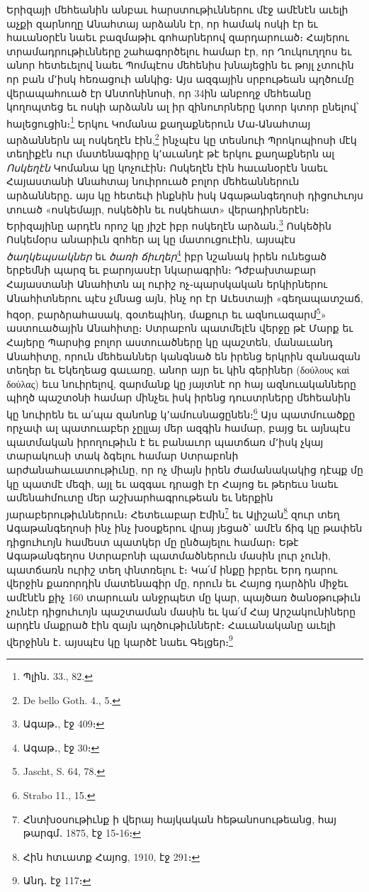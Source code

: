 \documentclass{article}
\begin{document}
{Երիզայի մեհեանին անբաւ հարստութիւններու մէջ ամէնէն աւելի աչքի զարնողը Անահտայ արձանն էր, որ համակ ոսկի էր եւ հաւանօրէն նաեւ բազմաթիւ գոհարներով զարդարուած։ Հայերու տրամադրութիւնները շահագործելու համար էր, որ Ղուկուղղոս եւ անոր հետեւելով նաեւ Պոմպէոս մեհենիս խնայեցին եւ թոյլ չտուին որ բան մ՚իսկ հեռացուի անկից։ Այս ազգային սրբութեան պղծումը վերապահուած էր Անտոնինոսի, որ 34ին անբողջ մեհեանը կողոպտեց եւ ոսկի արձանն ալ իր զինուորները կտոր կտոր ընելով՝ հալեցուցին։\footnote{Պլին․ 33., 82.} Երկու Կոմանա քաղաքներուն Մա֊Անահտայ արձաններն ալ ոսկեղէն էին,\footnote{De bello Goth. 4., 5.} ինչպէս կը տեսնուի Պրոկոպիոսի մէկ տեղիքէն ուր մատենագիրը կ՚աւանդէ թէ երկու քաղաքներն ալ \emph{Ոսկեղէն} Կոմանա կը կոչուէին։ Ոսկեղէն էին հաւանօրէն նաեւ Հայաստանի Անահտայ նուիրուած բոլոր մեհեաններուն արձանները․ այս կը հետեւի ինքնին իսկ Ագաթանգեղոսի դիցուհւոյս տուած «ոսկեմայր, ոսկեծին եւ ոսկեհատ» վերադիրներէն։ Երիզայինը արդէն որոշ կը յիշէ իբր ոսկեղէն արձան․\footnote{Ագաթ․, էջ 409։} Ոսկեծին Ոսկեմօրս անարիւն զոհեր ալ կը մատուցուէին, այսպէս \emph{ծաղկեպսակներ} եւ \emph{ծառի ճիւղեր}\footnote{Ագաթ․, էջ 30։} իբր նշանակ իրեն ունեցած երբեմնի պարզ եւ բարոյասէր նկարագրին։ Դժբախտաբար Հայաստանի Անահիտն ալ ուրիշ ոչ֊պարսկական երկիրներու Անահիտներու պէս չմնաց այն, ինչ որ էր Աւեստայի «գեղապատշաճ, հզօր, բարձրահասակ, գօտեպինդ, մաքուր եւ ազնուազարմ\footnote{Jascht, S. 64, 78.}» աստուածային Անահիտը։ Ստրաբոն պատմելէն վերջը թէ Մարք եւ Հայերը Պարսից բոլոր աստուածները կը պաշտեն, մանաւանդ Անահիտը, որուն մեհեաններ կանգնած են իրենց երկրին զանազան տեղեր եւ Եկեղեաց գաւառը, անոր այր եւ կին գերիներ (δούλους καὶ δούλας) եւս նուիրելով, զարմանք կը յայտնէ որ հայ ազնուականները պիղծ պաշտօնի համար մինչեւ իսկ իրենց դուստրները մեհեանին կը նուիրեն եւ ա՛պա զանոնք կ՚ամուսնացընեն։\footnote{Strabo 11., 15.} Այս պատմուածքը որչափ ալ պատուաբեր չըլլայ մեր ազգին համար, բայց եւ այնպէս պատմական իրողութիւն է եւ բանաւոր պատճառ մ՚իսկ չկայ տարակուսի տակ ձգելու համար Ստրաբոնի արժանահաւատութիւնը, որ ոչ միայն իրեն ժամանակակից դէպք մը կը պատմէ մեզի, այլ եւ ազգաւ դրացի էր Հայոց եւ թերեւս նաեւ ամենահմուտը մեր աշխարհագրութեան եւ ներքին յարաբերութիւններուն։ Հետեւաբար Էմին\footnote{Հնտխօսութիւնք ի վերայ հայկական հեթանոսութեանց, հայ թարգմ․ 1875, էջ 15֊16։} եւ Ալիշան\footnote{Հին հտւատք Հայոց, 1910, էջ 291։} զուր տեղ Ագաթանգեղոսի ինչ ինչ խօսքերու վրայ յեցած՝ ամէն ճիգ կը թափեն դիցուհւոյն համեստ պատկեր մը ընծայելու համար։ Եթէ Ագաթանգեղոս Ստրաբոնի պատմածներուն մասին լուր չունի, պատճառն ուրիշ տեղ փնտռելու է։ Կա՛մ ինքը իբրեւ Երդ դարու վերջին քառորդին մատենագիր մը, որուն եւ Հայոց դարձին միջեւ ամէնէն քիչ 160 տարուան անջրպետ մը կար, պայծառ ծանօթութիւն չունէր դիցուհւոյն պաշտաման մասին եւ կա՛մ Հայ Արշակունիները արդէն մաքրած էին զայն պղծութիւններէ։ Հաւանականը աւելի վերջինն է․ այսպէս կը կարծէ նաեւ Գելցեր։\footnote{Անդ․ էջ 117։}

}
\end{document}
